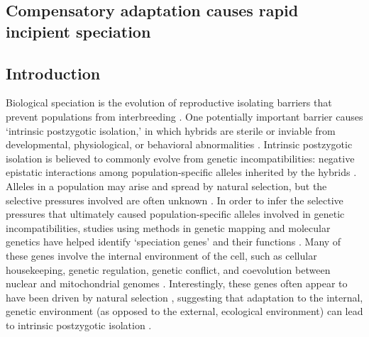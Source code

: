 \begin{doublespace}


\chapter{Compensatory adaptation causes rapid incipient speciation}
\label{chap:comp_spp}

\section{Introduction}

Biological speciation is the evolution of reproductive isolating
barriers that prevent populations from interbreeding \citep{coy04}.
%
One potentially important barrier causes `intrinsic postzygotic isolation,'
in which hybrids are sterile or inviable from developmental, physiological,
or behavioral abnormalities \citep{coy04}.
%
Intrinsic postzygotic isolation is believed to commonly evolve
from genetic incompatibilities: negative epistatic interactions
among population-specific alleles inherited by the hybrids \citep{pre10}.
%
Alleles in a population may arise and spread by natural selection,
but the selective pressures involved are often unknown \citep{sch09}.
%
In order to infer the selective pressures that ultimately caused
population-specific alleles involved in genetic incompatibilities,
studies using methods in genetic mapping and molecular genetics
have helped identify `speciation genes' and their functions
\citep{noo06,mah11}.
%
Many of these genes involve the internal environment of the cell,
such as cellular housekeeping, genetic regulation, genetic conflict,
and coevolution between nuclear and mitochondrial genomes \citep{noo06,wol10}.
%
Interestingly, these genes often appear to have been driven
by natural selection \citep{noo06}, suggesting that adaptation to the internal,
genetic environment (as opposed to the external, ecological environment)
can lead to intrinsic postzygotic isolation \citep{pha09,pre10}.




\end{doublespace}
